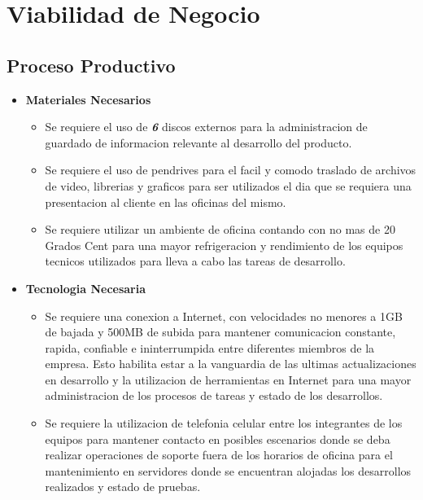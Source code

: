 \documentclass[
10pt, %
a4paper, %
oneside, %
headinclude,footinclude, %
BCOR5mm, %
]{scrartcl}
\begin{document}
\section {Viabilidad de Negocio}

\subsection{Proceso Productivo}
\begin{itemize}
  \item \textbf {Materiales Necesarios}
  \begin{itemize}
    \item Se requiere el uso de \emph { \textbf{6} } discos externos para la
            administracion de guardado de informacion relevante al desarrollo
            del producto.
    \item Se requiere el uso de pendrives para el facil
            y comodo traslado de archivos de video, librerias y graficos
            para ser utilizados el dia que se requiera una presentacion al
            cliente en las oficinas del mismo.
    \item Se requiere utilizar un ambiente de oficina  contando con no mas
            de 20 Grados Cent para una mayor refrigeracion y rendimiento de los
            equipos tecnicos utilizados para lleva a cabo las tareas de desarrollo.
  \end{itemize}

  \item \textbf {Tecnologia Necesaria}
  \begin{itemize}
    \item Se requiere una conexion a Internet, con velocidades no menores a
            1GB de bajada y 500MB de subida para mantener comunicacion
            constante, rapida, confiable e ininterrumpida entre diferentes
            miembros de la empresa. Esto habilita estar a la vanguardia de las
            ultimas actualizaciones en desarrollo y la utilizacion de
            herramientas en Internet para una mayor administracion de los
            procesos de tareas y estado de los desarrollos.
    \item Se requiere la utilizacion de telefonia celular entre los integrantes
            de los equipos para mantener contacto en posibles escenarios donde
            se deba realizar operaciones de soporte fuera de los horarios de
            oficina para el mantenimiento en servidores donde se encuentran
            alojadas los desarrollos realizados y estado de pruebas.


\end{itemize}
\end{itemize}
\end{document}
